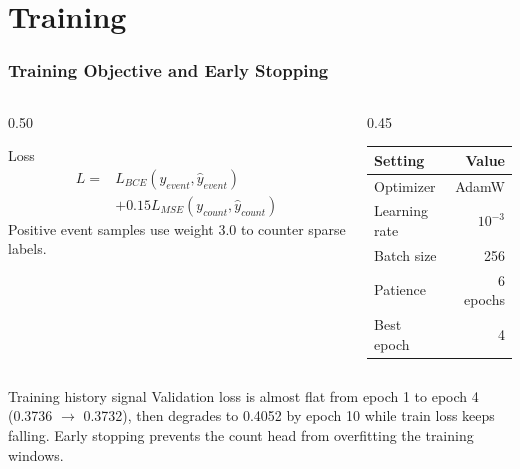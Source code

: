 \section{Training}

\begin{frame}
    \frametitle{Training Objective and Early Stopping}
    \footnotesize
    \begin{columns}[t]
        \begin{column}{0.50\textwidth}
            \begin{block}{Loss}
                \[
                    \begin{aligned}
                        L ={}& L_{BCE}(y_{event}, \hat{y}_{event}) \\
                              & + 0.15 L_{MSE}(y_{count}, \hat{y}_{count})
                    \end{aligned}
                \]
                Positive event samples use weight 3.0 to counter sparse labels.
            \end{block}
        \end{column}
        \begin{column}{0.45\textwidth}
            \begin{table}
                \centering
                \begin{tabular}{lr}
                    \toprule
                    Setting & Value \\
                    \midrule
                    Optimizer & AdamW \\
                    Learning rate & $10^{-3}$ \\
                    Batch size & 256 \\
                    Patience & 6 epochs \\
                    Best epoch & 4 \\
                    \bottomrule
                \end{tabular}
            \end{table}
        \end{column}
    \end{columns}

    \begin{exampleblock}{Training history signal}
        Validation loss is almost flat from epoch 1 to epoch 4 (0.3736 $\rightarrow$ 0.3732), then degrades to 0.4052 by epoch 10 while train loss keeps falling. Early stopping prevents the count head from overfitting the training windows.
    \end{exampleblock}
\end{frame}